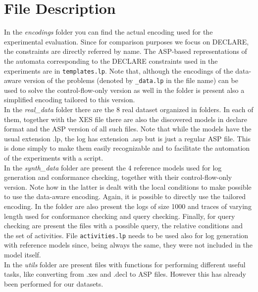 \section{File Description}

In the \emph{encodings} folder you can find the actual encoding used for the experimental evaluation. Since for comparison purposes we focus on DECLARE, the constraints are directly referred by name. The ASP-based representations of the automata corresponding to the DECLARE constraints used in the experiments are in \texttt{templates.lp}. Note that, although the encodings of the data-aware version of the problems (denoted by \texttt{\_data.lp} in the file name) can be used to solve the control-flow-only version as well in the folder is present also a simplified encoding tailored to this version.\\

In the \emph{real\_data} folder there are the 8 real dataset organized in folders. In each of them, together with the XES file there are also the discovered models in declare format and the ASP version of all such files. Note that while the models have the usual extension .lp, the log has extension .asp but is just a regular ASP file. This is done simply to make them easily recognizable and to facilitate the automation of the experiments with a script.\\

In the \emph{synth\_data} folder are present the 4 reference models used for log generation and conformance checking, together with their control-flow-only version. Note how in the latter is dealt with the local conditions to make possible to use the data-aware encoding. Again, it is possible to directly use the tailored encoding. In the folder are also present the logs of size 1000 and traces of varying length used for conformance checking and query checking. Finally, for query checking are present the files with a possible query, the relative conditions and the set of activities. File \texttt{activities.lp} needs to be used also for log generation with reference models since, being always the same, they were not included in the model itself. \\

In the \emph{utils} folder are present files with functions for performing different useful tasks, like converting from .xes and .decl to ASP files. However this has already been performed for our datasets. 